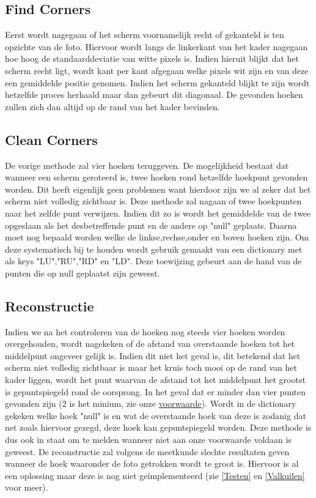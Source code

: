 \subsection{Find Corners}
Eerst wordt nagegaan of het scherm voornamelijk recht of gekanteld is ten opzichte van de foto. Hiervoor wordt langs de linkerkant van het kader nagegaan hoe hoog de standaarddeviatie van witte pixels is. Indien hieruit blijkt dat het scherm recht ligt, wordt kant per kant afgegaan welke pixels wit zijn en van deze een gemiddelde positie genomen. Indien het scherm gekanteld blijkt te zijn wordt hetzelfde proces herhaald maar dan gebeurt dit diagonaal. De gevonden hoeken zullen zich dan altijd op de rand van het kader bevinden. 

\subsection{Clean Corners}
De vorige methode zal vier hoeken teruggeven. De mogelijkheid bestaat dat wanneer een scherm geroteerd is, twee hoeken rond hetzelfde hoekpunt gevonden worden. Dit heeft eigenlijk geen problemen want hierdoor zijn we al zeker dat het scherm niet volledig zichtbaar is. Deze methode zal nagaan of twee hoekpunten naar het zelfde punt verwijzen. Indien dit zo is wordt het gemiddelde van de twee opgeslaan als het desbetreffende punt en de andere op "null" geplaats. Daarna moet nog bepaald worden welke de linkse,rechse,onder en boven hoeken zijn. Om deze systematisch bij te houden wordt gebruik gemaakt van een dictionary met als keys "LU","RU","RD"  \space en "LD". Deze toewijzing gebeurt aan de hand van de punten die op null geplaatst zijn geweest.

\subsection{Reconstructie} \label{reconstructie}
Indien we na het controleren van de hoeken nog steeds vier hoeken worden overgehouden, wordt nagekeken of de afstand van overstaande hoeken tot het middelpunt ongeveer gelijk is. Indien dit niet het geval is, dit betekend dat het scherm niet volledig zichtbaar is maar het kruis toch mooi op de rand van het kader liggen, wordt het punt waarvan de afstand tot het middelpunt het grootst is gepuntspiegeld rond de oorsprong.
In het geval dat er minder dan vier punten gevonden zijn (2 is het minium, zie onze \hyperref[voorwaarde]{voorwaarde}). Wordt in de dictionary gekeken welke hoek "null" is en wat  de overstaande hoek van deze is zodanig dat net zoals hiervoor gezegd, deze hoek kan gepuntspiegeld worden. Deze methode is dus ook in staat om te melden wanneer niet aan onze voorwaarde voldaan is geweest. De reconstructie zal volgens de meetkunde slechte resultaten geven wanneer de hoek waaronder de foto getrokken wordt te groot is. Hiervoor is al een oplossing maar deze is nog niet geïmplementeerd (zie \ref{Testen} en \ref{Valkuilen} voor meer).

